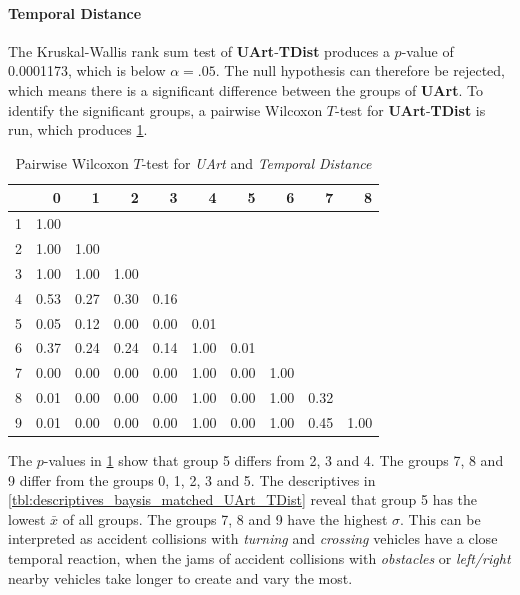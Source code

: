 \paragraph{Temporal Distance}
The Kruskal-Wallis rank sum test of \textbf{UArt}-\textbf{TDist} produces a $p$-value of 0.0001173, which is below $\alpha=.05$. The null hypothesis can therefore be rejected, which means there is a significant difference between the groups of \textbf{UArt}. To identify the significant groups, a pairwise Wilcoxon $T$-test for \textbf{UArt}-\textbf{TDist} is run, which produces \cref{tbl:wilcoxon_baysis_matched_UArt_TDist}. 
\begin{table}[ht]
	\small
	\centering
	\begin{tabular}{rrrrrrrrrr}
  		\toprule
		& 0 & 1 & 2 & 3 & 4 & 5 & 6 & 7 & 8 \\ 
		\midrule
		1 & 1.00 &  &  &  &  &  &  &  &  \\ 
		2 & 1.00 & 1.00 &  &  &  &  &  &  &  \\ 
		3 & 1.00 & 1.00 & 1.00 &  &  &  &  &  &  \\ 
		4 & 0.53 & 0.27 & 0.30 & 0.16 &  &  &  &  &  \\ 
		5 & 0.05 & 0.12 & 0.00 & 0.00 & 0.01 &  &  &  &  \\ 
		6 & 0.37 & 0.24 & 0.24 & 0.14 & 1.00 & 0.01 &  &  &  \\ 
		7 & 0.00 & 0.00 & 0.00 & 0.00 & 1.00 & 0.00 & 1.00 &  &  \\ 
		8 & 0.01 & 0.00 & 0.00 & 0.00 & 1.00 & 0.00 & 1.00 & 0.32 &  \\ 
		9 & 0.01 & 0.00 & 0.00 & 0.00 & 1.00 & 0.00 & 1.00 & 0.45 & 1.00 \\ 
		\bottomrule
	\end{tabular}
	\caption{Pairwise Wilcoxon $T$-test for \textit{UArt} and \textit{Temporal Distance}}
	\label{tbl:wilcoxon_baysis_matched_UArt_TDist}
\end{table}
The $p$-values in \cref{tbl:wilcoxon_baysis_matched_UArt_TDist} show that group 5 differs from 2, 3 and 4. The groups 7, 8 and 9 differ from the groups 0, 1, 2, 3 and 5. The descriptives in \cref{tbl:descriptives_baysis_matched_UArt_TDist} reveal that group 5 has the lowest $\bar{x}$ of all groups. The groups 7, 8 and 9 have the highest $\sigma$. This can be interpreted as accident collisions with \textit{turning} and \textit{crossing} vehicles have a close temporal reaction, when the jams of accident collisions with \textit{obstacles} or \textit{left/right} nearby vehicles take longer to create and vary the most.

